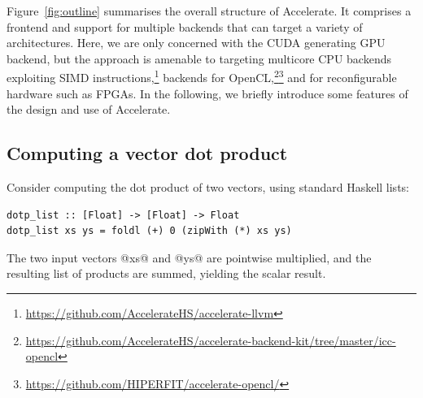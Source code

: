 Figure~\ref{fig:outline} summarises the overall structure of Accelerate. It
comprises a frontend and support for multiple backends that can target a variety
of architectures. Here, we are only concerned with the CUDA\cuda{} generating
GPU\gpu{} backend, but the approach is amenable to targeting multicore CPU
backends exploiting SIMD
instructions,\footnote{\url{https://github.com/AccelerateHS/accelerate-llvm}}
backends for
OpenCL,\footnote{\url{https://github.com/AccelerateHS/accelerate-backend-kit/tree/master/icc-opencl}}\footnote{\url{https://github.com/HIPERFIT/accelerate-opencl/}}
and for reconfigurable hardware such as FPGAs. In the following, we briefly
introduce some features of the design and use of Accelerate.


\subsection{Computing a vector dot product}
\label{sec:computing_dotp}

Consider computing the dot product of two vectors, using standard Haskell lists:
%
\begin{lstlisting}[style=haskell]
dotp_list :: [Float] -> [Float] -> Float
dotp_list xs ys = foldl (+) 0 (zipWith (*) xs ys)
\end{lstlisting}
%
The two input vectors @xs@ and @ys@ are pointwise multiplied, and the resulting
list of products are summed, yielding the scalar result.

